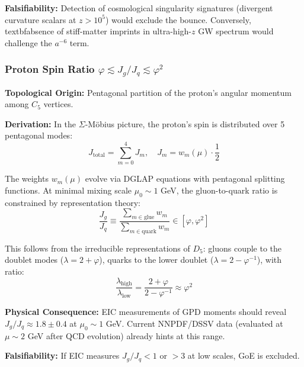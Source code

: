 \documentclass[12pt]{article}
\theoremstyle{definition}
\theoremstyle{plain}
\begin{document}
\textbf{Falsifiability:} Detection of cosmological singularity signatures (divergent curvature scalars at $z > 10^5$) would exclude the bounce. Conversely, \\textbf{absence} of stiff-matter imprints in ultra-high-$z$ GW spectrum would challenge the $a^{-6}$ term.

\subsubsection{Proton Spin Ratio $\varphi \lesssim J_g/J_q \lesssim \varphi^2$}

\textbf{Topological Origin:} Pentagonal partition of the proton's angular momentum among $C_5$ vertices.

\textbf{Derivation:} In the $\Sigma$-M\"obius picture, the proton's spin is distributed over 5 pentagonal modes:
\begin{equation}
J_{\text{total}} = \sum_{m=0}^4 J_m, \quad J_m = w_m(\mu) \cdot \frac{1}{2}
\end{equation}

The weights $w_m(\mu)$ evolve via DGLAP equations with pentagonal splitting functions. At minimal mixing scale $\mu_0 \sim 1$ GeV, the gluon-to-quark ratio is constrained by representation theory:
\begin{equation}
\frac{J_g}{J_q} \equiv \frac{\sum_{m \in \text{glue}} w_m}{\sum_{m \in \text{quark}} w_m} \in \left[\varphi, \varphi^2\right]
\end{equation}

This follows from the irreducible representations of $D_5$: gluons couple to the doublet modes ($\lambda = 2 + \varphi$), quarks to the lower doublet ($\lambda = 2 - \varphi^{-1}$), with ratio:
\begin{equation}
\frac{\lambda_{\text{high}}}{\lambda_{\text{low}}} = \frac{2 + \varphi}{2 - \varphi^{-1}} \approx \varphi^2
\end{equation}

\textbf{Physical Consequence:} EIC measurements of GPD moments should reveal $J_g/J_q \approx 1.8 \pm 0.4$ at $\mu_0 \sim 1$ GeV. Current NNPDF/DSSV data (evaluated at $\mu \sim 2$ GeV after QCD evolution) already hints at this range.

\textbf{Falsifiability:} If EIC measures $J_g/J_q < 1$ or $> 3$ at low scales, GoE is excluded.


\end{document}
